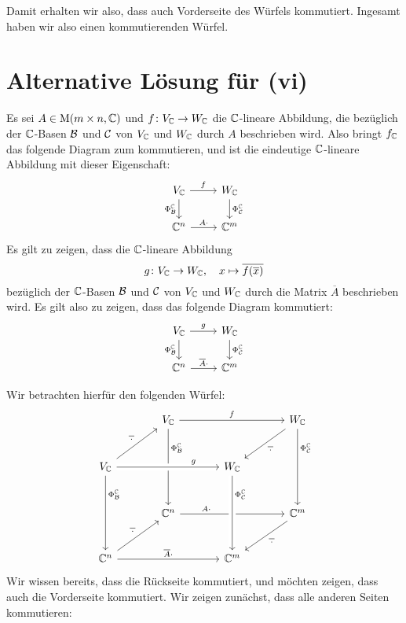 \documentclass[a4paper,10pt]{article}
\begin{document}
Damit erhalten wir also, dass auch Vorderseite des Würfels kommutiert.
Ingesamt haben wir also einen kommutierenden Würfel.










\section{Alternative Lösung für (vi)}

Es sei $A \in \operatorname{M}(m \times n, \mathbb{C})$ und $f \colon V_{\mathbb{C}} \to W_{\mathbb{C}}$ die $\mathbb{C}$-lineare Abbildung, die bezüglich der $\mathbb{C}$-Basen $\mathcal{B}$ und $\mathcal{C}$ von $V_{\mathbb{C}}$ und $W_{\mathbb{C}}$ durch $A$ beschrieben wird.
Also bringt $f_{\mathbb{C}}$ das folgende Diagram zum kommutieren, und ist die eindeutige $\mathbb{C}$-lineare Abbildung mit dieser Eigenschaft:
\[
  \begin{tikzcd}
      V_\Cbb
      \arrow[r, "f"]
      \arrow[d, "\Phi^\Cbb_\mc{B}"']
    & W_\Cbb
      \arrow[d, "\Phi^\Cbb_\mc{C}"]
    \\
      \Cbb^n
      \arrow[r, "A \cdot"]
    & \Cbb^m
  \end{tikzcd}
\]
Es gilt zu zeigen, dass die $\mathbb{C}$-lineare Abbildung
\[
  g \colon V_{\mathbb{C}} \to W_{\mathbb{C}},
  \quad
  x \mapsto \overline{f(\overline{x})}
\]
bezüglich der $\mathbb{C}$-Basen $\mathcal{B}$ und $\mathcal{C}$ von $V_{\mathbb{C}}$ und $W_{\mathbb{C}}$ durch die Matrix $\overline{A}$ beschrieben wird.
Es gilt also zu zeigen, dass das folgende Diagram kommutiert:
\[
  \begin{tikzcd}
      V_\Cbb
      \arrow[r, "g"]
      \arrow[d, "\Phi^\Cbb_\mc{B}"']
    & W_\Cbb
      \arrow[d, "\Phi^\Cbb_\mc{C}"]
    \\
      \Cbb^n
      \arrow[r, "\overline{A} \cdot"]
    & \Cbb^m
  \end{tikzcd}
\]

Wir betrachten hierfür den folgenden Würfel:
\[
  \begin{tikzcd}[row sep = large, column sep = large]
      {}
    & V_\Cbb
      \arrow[rr, "f"]
      \arrow[dd, "\Phi^\Cbb_\mc{B}" near start]
    & {}
    & W_\Cbb
      \arrow[dl, "\overline{\,\cdot\,}"]
      \arrow[dd, "\Phi^\Cbb_\mc{C}" near start]
    \\
      V_\Cbb
      \arrow[ur, "\overline{\,\cdot\,}"]
      \arrow[rr, crossing over, "g" near end]
      \arrow[dd, "\Phi^\Cbb_\mc{B}" near start]
    & {}
    & W_\Cbb
    & {}
    \\
      {}
    & \Cbb^n
      \arrow[rr, "A \cdot" near start]
    & {}
    & \Cbb^m
      \arrow[dl, "\overline{\,\cdot\,}"]
    \\
      \Cbb^n
      \arrow[ur, "\overline{\,\cdot\,}"]
      \arrow[rr, "\overline{A} \cdot "]
    & {}
    & \Cbb^m
      \arrow[from=uu, crossing over, "\Phi^\Cbb_\mc{C}" near start]
    & {}
  \end{tikzcd}
\]
Wir wissen bereits, dass die Rückseite kommutiert, und möchten zeigen, dass auch die Vorderseite kommutiert.
Wir zeigen zunächst, dass alle anderen Seiten kommutieren:
\end{document}
